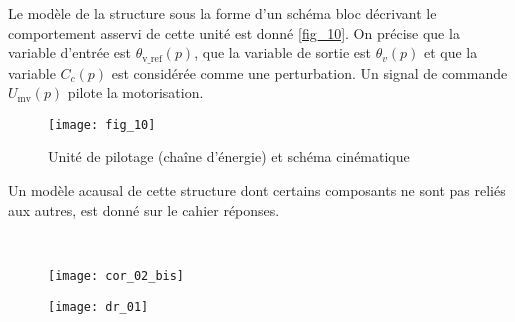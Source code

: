 Le modèle de la structure sous la forme d'un schéma bloc décrivant le comportement asservi de cette
unité est donné \autoref{fig_10}. On précise que la variable d'entrée est $\theta_{\text{v\_ref}}(p)$, que la variable de sortie est $\theta_{v}(p)$ et que la variable $C_c(p)$ est considérée comme une perturbation. Un signal de commande $U_{\text{mv}}(p)$ pilote la motorisation.



\begin{figure}[H]
\centering
\texttt{[image: fig\_10]}

\caption{Unité de pilotage (chaîne d'énergie) et schéma cinématique  \label{fig_10}}
\end{figure}

Un modèle acausal de cette structure dont certains composants ne sont pas reliés aux autres, est
donné sur le cahier réponses.

\fi

\ifprof
\begin{corrige}
~\\

\begin{figure}[H]
\centering
\texttt{[image: cor\_02\_bis]}
\end{figure}
\end{corrige}
\else
\fi



\ifprof
\else
\begin{figure}[H]
\centering
\texttt{[image: dr\_01]}
\end{figure}
\fi